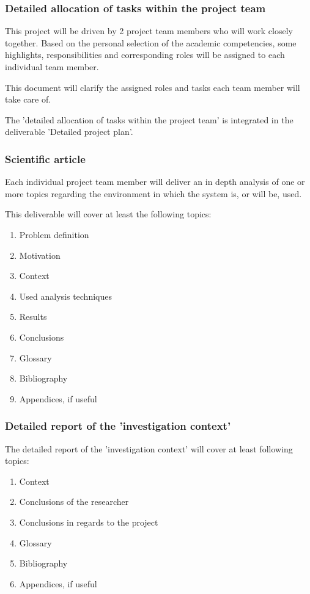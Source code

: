 \subsubsection{Detailed allocation of tasks within the project team}

This project will be driven by 2 project team members who will work closely together.
Based on the personal selection of the  academic competencies, some highlights, responsibilities and corresponding roles will be assigned to each individual team member. 

This document will clarify the assigned roles and tasks each team member will take care of.

The 'detailed allocation of tasks within the project team' is integrated in the deliverable 'Detailed project plan'.

\subsubsection{Scientific article}

Each individual project team member will deliver an in depth analysis of one or more topics regarding the environment in which the system is, or will be, used. 

This deliverable will cover at least the following topics:

 	\begin{enumerate}
		\item Problem definition
		\item Motivation
		\item Context
		\item Used analysis techniques
		\item Results
		\item Conclusions
		\item Glossary
		\item Bibliography
		\item Appendices, if useful
	\end {enumerate}

\subsubsection{Detailed report of the 'investigation context'}

The detailed report of the 'investigation context' will cover at least following topics:

 	\begin{enumerate}
		\item Context
		\item Conclusions of the researcher
		\item Conclusions in regards to the project
		\item Glossary
		\item Bibliography
		\item Appendices, if useful
	\end {enumerate}

